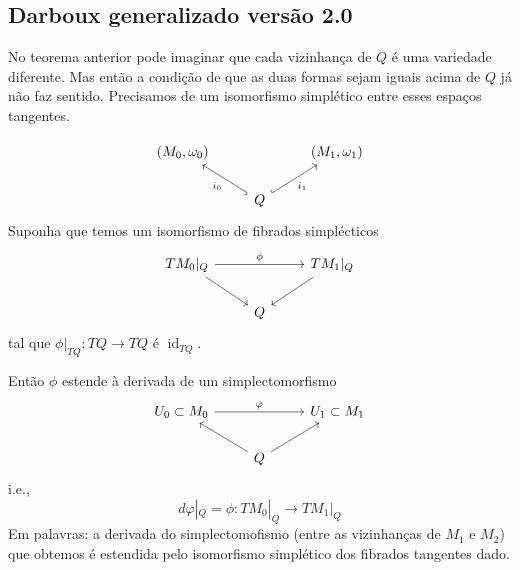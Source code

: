 \subsection{Darboux generalizado vers\~ao 2.0}
No teorema anterior pode imaginar que cada vizinhança de $Q$ \'e uma variedade diferente. Mas ent\~ao a condi\c c\~ao de que as duas formas sejam iguais acima de $Q$ j\'a n\~ao faz sentido. Precisamos de um isomorfismo simpl\'etico entre esses espaços tangentes.

\begin{thm}\leavevmode
	\[\begin{tikzcd}
		(M_0,\omega_0)&&(M_1,\omega_1)\\
	&Q\arrow[ul,"i_0",hook]\arrow[ur,"i_1",hook,swap]
	\end{tikzcd}\]
	Suponha que temos um isomorfismo de fibrados simpl\'ecticos
	\[\begin{tikzcd}
	TM_0|_{Q}\arrow[rr,"\phi"]\arrow[dr,swap]&&TM_1|_{Q}\arrow[dl]\\
	&Q
	\end{tikzcd}\]
tal que $\phi|_{TQ}:TQ\to TQ$ é $\operatorname{id}_{TQ}$.

	Ent\~ao $\phi$ estende à derivada de um simplectomorfismo
	\[\begin{tikzcd}
	U_0\subset M_0\arrow[rr,"\varphi"]&&U_1\subset M_1\\
	&Q\arrow[ul]\arrow[ur,swap]
	\end{tikzcd}\]
	i.e.,
	\[d\varphi|_{Q}=\phi:TM_0|_{Q}\to TM_1|_{Q}\]
	Em palavras: a derivada do simplectomofismo (entre as vizinhanças de $M_1$ e $M_2$) que obtemos é estendida pelo isomorfismo simpl\'etico dos fibrados tangentes dado.
\end{thm}

